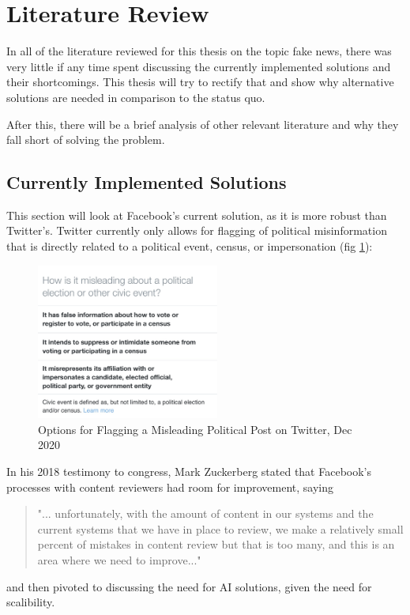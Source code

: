 \documentclass[12pt]{article}
\begin{document}
\section{Literature Review}
In all of the literature reviewed for this thesis on the topic fake news, there was very little if any time spent discussing the currently implemented solutions and their shortcomings. This thesis will try to rectify that and show why alternative solutions are needed in comparison to the status quo.

After this, there will be a brief analysis of other relevant literature and why they fall short of solving the problem.

\subsection{Currently Implemented Solutions}
This section will look at Facebook's current solution, as it is more robust than Twitter's. Twitter currently only allows for flagging of political misinformation that is directly related to a political event, census, or impersonation (fig \ref{img:TwitterPolitics}):
\begin{figure}[htp]
    \centering
    \includegraphics[width=6cm]{TwitterPolitics.jpg}
    \caption{Options for Flagging a Misleading Political Post on Twitter, Dec 2020}
    \label{img:TwitterPolitics}
\end{figure}

In his 2018 testimony to congress, Mark Zuckerberg stated that Facebook's processes with content reviewers had room for improvement, saying \begin{quote}"... unfortunately, with the amount of content in our systems and the current systems that we have in place to review, we make a relatively small percent of mistakes in content review but that is too many, and this is an area where we need to improve..." \cite{energy2018facebook}\end{quote} and then pivoted to discussing the need for AI solutions, given the need for scalibility.
\end{document}
